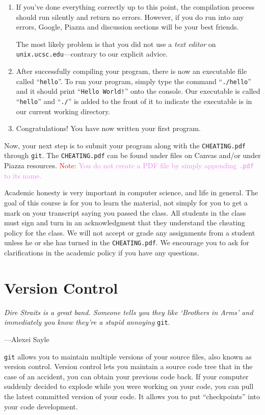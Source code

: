 \documentclass[11pt]{article}
\begin{document}
\begin{enumerate}
	\item If you've done everything correctly up to this point, the compilation
        process should run silently and return no errors. However, if you do run
        into any errors, Google, Piazza and discussion sections will be your best
        friends.

The most likely problem is that you did not use a \emph{text editor} on
\texttt{unix.ucsc.edu}---contrary to our explicit advice.

	\item After successfully compiling your program, there is now an
executable file called ``\texttt{hello}''. To run your program, simply type
the command ``\texttt{./hello}'' and it should print ``\texttt{Hello World!}''
onto the console. Our executable is called ``\texttt{hello}'' and ``\texttt{./}'' is added to the front of it to indicate the executable is in our current working directory.

	\item Congratulations! You have now written your first program.
\end{enumerate}

Now, your next step is to submit your program along with the
\texttt{CHEATING.pdf} through \texttt{git}. The \texttt{CHEATING.pdf} can be found under files on Canvas and/or under Piazza resources.
\textcolor{red}{Note:}
\textcolor{violet}{You do not create a PDF file by simply appending \texttt{.pdf} to its name.}

Academic honesty is
very important in computer science, and life in general. The
goal of this course is for you to learn the material, not simply
for you to get a mark on your transcript saying you passed the
class. All students in the class must sign and turn in an acknowledgment
that they understand the cheating policy for the class. We will not
accept or grade any assignments from a student unless he or she has
turned in the \texttt{CHEATING.pdf}. We encourage you to ask for
clarifications in the academic policy if you have any questions.


\section{Version Control}
\epigraph{\emph{Dire Straits is a great band. Someone tells you they like
`Brothers in Arms' and immediately you know they're a stupid annoying}
\texttt{git}.}{---Alexei Sayle}

\noindent \texttt{git} allows you to maintain multiple versions of your source
files, also known as version control. Version control lets you
maintain a source code tree that in the case of an accident, you
can obtain your previous code back. If your computer suddenly decided
to explode while you were working on your code, you can pull the
latest committed version of your code. It allows you to
put ``checkpoints'' into your code development.
\end{document}
